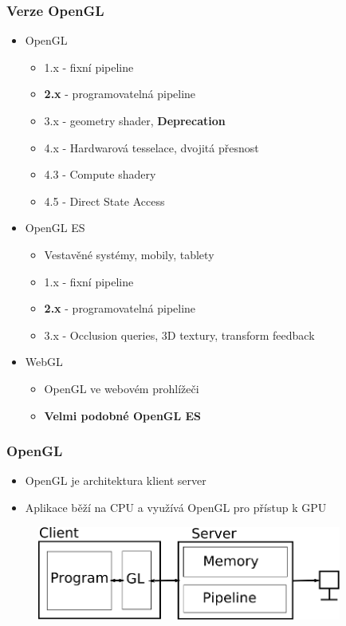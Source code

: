 \begin{frame}
\frametitle{Verze OpenGL}
  \begin{itemize}

  \item{OpenGL}
  \begin{itemize}
  \item{1.x - fixní pipeline}
  \item{\textbf{2.x} - programovatelná pipeline}
  \item{3.x - geometry shader, \textbf{Deprecation}}
  \item{4.x - Hardwarová tesselace, dvojitá přesnost}
  \item{4.3 - Compute shadery}
  \item{4.5 - Direct State Access}
  \end{itemize}

  \item{OpenGL ES}
  \begin{itemize}
  \item{Vestavěné systémy, mobily, tablety}
  \item{1.x - fixní pipeline}
  \item{\textbf{2.x} - programovatelná pipeline}
  \item{3.x - Occlusion queries, 3D textury, transform feedback}
  \end{itemize}

  \item{WebGL}
  \begin{itemize}
  \item{OpenGL ve webovém prohlížeči}
  \item{\textbf{Velmi podobné OpenGL ES}}
  \end{itemize}

  \end{itemize}
\end{frame}

\begin{frame}
\frametitle{OpenGL}
  \begin{itemize}
    \item{OpenGL je architektura klient server}
    \item{Aplikace běží na CPU a využívá OpenGL pro přístup k GPU}
  \end{itemize}
  \begin{figure}[h]
    \includegraphics[width=10cm,keepaspectratio]{pics/opengl/clientserver}
  \end{figure}
\end{frame}


